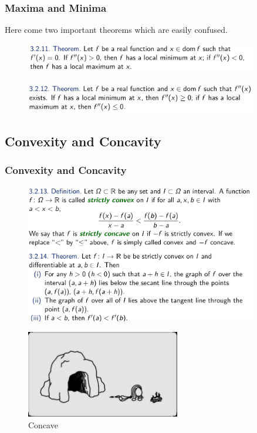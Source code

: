 \documentclass[10pt, t]{beamer}
\begin{document}
\begin{frame}
    \frametitle{Maxima and Minima}
    Here come two important theorems which are easily confused.
    \begin{figure}[H]
        \centering
        \includegraphics[width=0.9\textwidth]{2020-11-04-12-36-35.png}
    \end{figure}
    \begin{figure}[H]
        \centering
        \includegraphics[width=0.9\textwidth]{2020-11-04-12-36-50.png}
    \end{figure}
\end{frame}

\subsection{Convexity and Concavity}
\begin{frame}[allowframebreaks]
    \frametitle{Convexity and Concavity}
    \begin{figure}[H]
        \centering
        \includegraphics[width=0.9\textwidth]{2020-11-04-12-39-22.png}
    \end{figure}
    \begin{figure}[H]
        \centering
        \includegraphics[width=0.6\textwidth]{2020-11-04-17-15-27.png}
        \caption{Concave}
    \end{figure}

\end{frame}
\end{document}
